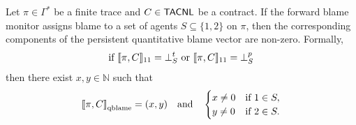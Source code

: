             \begin{lemma}
                \label{lem:qblame-vs-forward}
                Let $\pi \in \Gamma^*$ be a finite trace and $C \in \mathsf{TACNL}$ be a contract.
                If the forward blame monitor assigns blame to a set of agents $S \subseteq \{1,2\}$ on $\pi$, then the corresponding components of the persistent quantitative blame vector are non-zero. Formally,
                \[
                  \text{if } \llbracket \pi,C \rrbracket_{11} = \bot^t_{S} \text{ or } \llbracket \pi,C \rrbracket_{11} = \bot^p_{S}
                \]
                then there exist $x,y \in \mathbb{N}$ such that
                \[
                  \left\llbracket \pi,C \right\rrbracket_{\text{qblame}} = (x,y)
                  \quad\text{and}\quad
                  \begin{cases}
                    x \neq 0 & \text{if } 1 \in S,\\
                    y \neq 0 & \text{if } 2 \in S.
                  \end{cases}
                \]
                \end{lemma}
